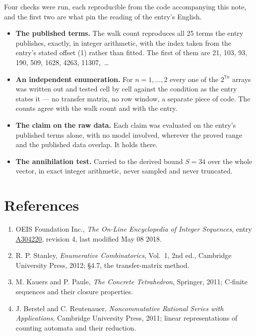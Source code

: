 \documentclass[11pt]{article}
\theoremstyle{definition}
\begin{document}
Four checks were run, each reproducible from the code accompanying this note, and the first two are what pin the reading of the entry's English.

\begin{itemize}

\item {\bfseries The published terms.} The walk count reproduces all 25 terms the entry publishes, exactly, in integer arithmetic, with the index taken from the entry's stated offset (1) rather than fitted. The first of them are 21, 103, 93, 190, 509, 1628, 4263, 11307,~\dots

\item {\bfseries An independent enumeration.} For $n = 1,\dots,2$ every one of the $2^{7n}$ arrays was written out and tested cell by cell against the condition as the entry states it --- no transfer matrix, no row window, a separate piece of code. The counts agree with the walk count and with the entry.

\item {\bfseries The claim on the raw data.} Each claim was evaluated on the entry's published terms alone, with no model involved, wherever the proved range and the published data overlap. It holds there.

\item {\bfseries The annihilation test.} Carried to the derived bound $S = 34$ over the whole vector, in exact integer arithmetic, never sampled and never truncated.

\end{itemize}

\section{References}

\begin{enumerate}

\item OEIS Foundation Inc., \emph{The On-Line Encyclopedia of Integer Sequences}, entry \href{https://oeis.org/A304220}{A304220}, revision 4, last modified May 08 2018.

\item R. P. Stanley, \emph{Enumerative Combinatorics}, Vol.~1, 2nd ed., Cambridge University Press, 2012; \S4.7, the transfer-matrix method.

\item M. Kauers and P. Paule, \emph{The Concrete Tetrahedron}, Springer, 2011; C-finite sequences and their closure properties.

\item J. Berstel and C. Reutenauer, \emph{Noncommutative Rational Series with Applications}, Cambridge University Press, 2011; linear representations of counting automata and their reduction.

\end{enumerate}
\end{document}
